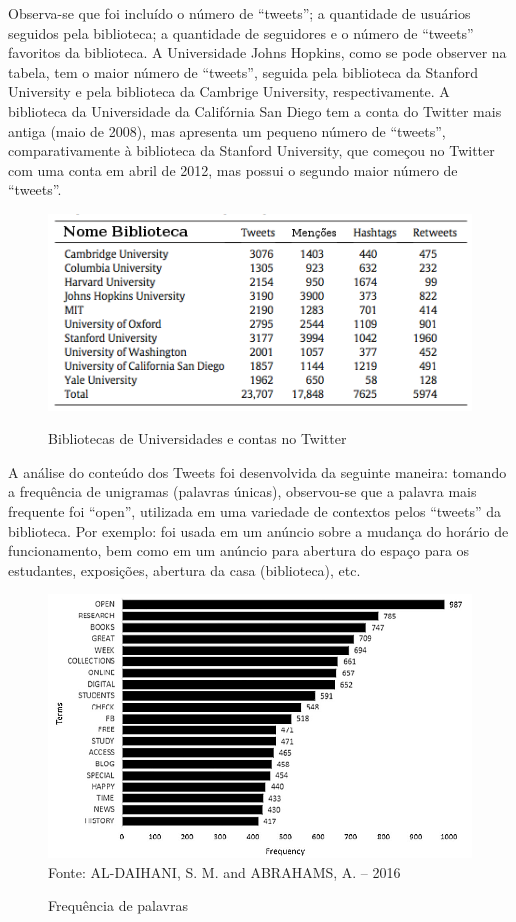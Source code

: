 Observa-se que foi incluído o número de ``tweets''; a quantidade de usuários seguidos pela biblioteca; a quantidade de seguidores e o número de ``tweets'' favoritos da biblioteca. A Universidade Johns Hopkins, como se pode observer na tabela, tem o maior número de
``tweets'', seguida pela biblioteca da Stanford University e pela biblioteca da Cambrige University, respectivamente. A biblioteca da Universidade da Califórnia San Diego tem a conta do Twitter mais antiga (maio de 2008), mas apresenta um pequeno número de ``tweets'',
comparativamente à biblioteca da Stanford University, que começou no Twitter com uma conta em abril de 2012, mas possui o segundo maior número de ``tweets''. 


\begin{figure}
\centering
\caption{Bibliotecas de Universidades e contas no Twitter}
\includegraphics[width=0.7\linewidth]{Figuras/Twitter/contaPalavras}
\label{fig:contaPalavras}
\end{figure}


A análise do conteúdo dos Tweets foi desenvolvida da seguinte maneira: tomando a frequência de unigramas (palavras únicas), observou-se que a palavra mais frequente foi “open”, utilizada em uma variedade de contextos pelos ``tweets'' da biblioteca. Por exemplo: foi usada em um anúncio sobre a mudança do horário de funcionamento, bem como em um anúncio para abertura do espaço para os estudantes, exposições, abertura da casa (biblioteca), etc. 

\begin{figure}[ht]
	\centering
	\caption{Frequência de palavras}
	\includegraphics[width=0.6\linewidth]{Figuras/Twitter/ferqPalavras}\\
	\tiny Fonte: AL-DAIHANI, S. M. and ABRAHAMS, A. -- 2016
	\label{fig:ferqPalavras}
\end{figure}


